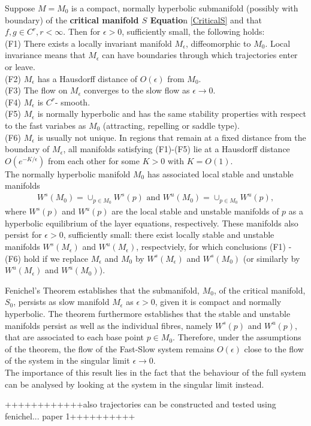 \begin{theorem} \label{Fenichel}	
	Suppose $M=M_0$ is a compact, normally hyperbolic submanifold  (possibly with boundary) of the \textbf{critical manifold $S$ Equatio}n \ref{CriticalS} 	and  that $f, g \in C^r, r < \infty $. Then for $\epsilon >0$, sufficiently small, the following holds:\\
	(F1) There exists a locally invariant manifold $M_{\epsilon}$, diffeomorphic to  $M_0$. Local invariance means that $M_{\epsilon}$ can have boundaries through which trajectories enter or leave.\\
	(F2) $M_{\epsilon}$ has a Hausdorff distance of $O(\epsilon)$ from $M_0$.\\
	(F3) The flow on $M_{\epsilon}$  converges to the slow flow as $\epsilon \to 0$.\\
	(F4) $M_{\epsilon}$ is $C^r$- smooth.\\
	(F5) $M_{\epsilon}$ is normally hyperbolic and has the same stability properties with respect to the fast variabes as $M_0$ (attracting, repelling or saddle type).\\
	(F6) $M_{\epsilon}$ is usually not unique. In regions that remain at a fixed distance from the boundary of  $M_{\epsilon}$, all manifolds satisfying (F1)-(F5) lie at a Hausdorff distance $O(e^{-K/\epsilon})$ from each other for some $K>0$ with $K=O(1)$.\\
	The normally hyperbolic manifold $M_0$ has associated local stable and unstable manifolds
	\begin{align*}
	W^s(M_0) =\cup_{p \in M_0} W^s(p) \textrm{\ \ and\ \ } W^u(M_0) =\cup_{p \in M_0} W^u(p),
	\end{align*}
	where  $W^s(p)$ and $W^u(p)$ are the local stable and unstable manifolds of $p$ as a hyperbolic equilibrium of the layer equations, respectively. These manifolds also persist for $\epsilon > 0$, sufficiently small: there exist locally stable and unstable manifolds $W^s(M_\epsilon)$ and $W^u(M_\epsilon)$, respectviely, for which conclusions (F1) - (F6) hold if we replace $M_\epsilon$ and $M_0$ by  $W^s(M_\epsilon)$ and $W^s(M_0)$ (or similarly by  $W^u(M_\epsilon)$ and $W^u(M_0)$).
\end{theorem} 
Fenichel's Theorem establishes that the submanifold, $M_0$, of the critical manifold, $S_0$, persists as slow manifold $M_\epsilon$ as $\epsilon >0$, given it is compact and normally hyperbolic. The theorem furthermore establishes that the stable and unstable manifolds persist as well as the individual fibres, namely $W^s(p)$ and $W^u(p)$, that are associated to each base point $p \in M_0$.
Therefore, under the assumptions of the theorem, the flow of the Fast-Slow system remains $O(\epsilon)$ close to the flow of the system in the singular limit $\epsilon \to 0$.\\

The importance of this result lies in the fact that the behaviour of the full system can be analysed by looking at the system in the singular limit instead.


++++++++++++also trajectories can be constructed and tested using fenichel... paper 1++++++++++


